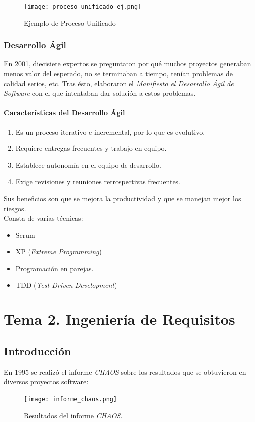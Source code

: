 \documentclass[12pt,spanish]{article}
\begin{document}
\begin{figure}[H]
	\centering
	\texttt{[image: proceso\_unificado\_ej.png]}
	\caption{Ejemplo de Proceso Unificado}
\end{figure}

\subsubsection{Desarrollo Ágil}
En 2001, diecisiete expertos se preguntaron por qué muchos proyectos generaban menos valor del esperado, no se terminaban a tiempo, tenían problemas de calidad serios, etc. Tras ésto, elaboraron el \emph{Manifiesto el Desarrollo Ágil de Software} con el que intentaban dar solución a estos problemas.
\paragraph{Características del Desarrollo Ágil}
\begin{enumerate}
	\item Es un proceso iterativo e incremental, por lo que es evolutivo.
	\item Requiere entregas frecuentes y trabajo en equipo.
	\item Establece autonomía en el equipo de desarrollo.
	\item Exige revisiones y reuniones retrospectivas frecuentes.
\end{enumerate}
Sus beneficios son que se mejora la productividad y que se manejan mejor los riesgos.\\
Consta de varias técnicas:
\begin{itemize}
	\item Scrum
	\item XP (\emph{Extreme Programming})
	\item Programación en parejas.
	\item TDD (\emph{Test Driven Development})
\end{itemize}

\newpage

 
\section{Tema 2. Ingeniería de Requisitos}

\subsection{Introducción}

En 1995 se realizó el informe \emph{CHAOS} sobre los resultados que se obtuvieron en diversos proyectos software:
\begin{figure}[H]
\centering
\texttt{[image: informe\_chaos.png]}
\caption{Resultados del informe \emph{CHAOS}.}
\end{figure}
\end{document}
